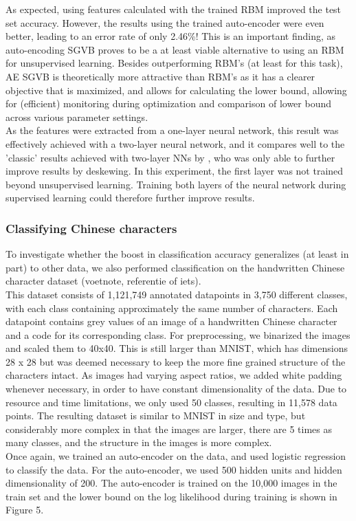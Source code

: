 \documentclass{article}
\begin{document}
As expected, using features calculated with the trained RBM improved the test set accuracy. However, the results using the trained auto-encoder were even better, leading to an error rate of only 2.46\%! This is an important finding, as auto-encoding SGVB proves to be a at least viable alternative to using an RBM for unsupervised learning. Besides outperforming RBM's (at least for this task), AE SGVB is theoretically more attractive than RBM's as it has a clearer objective that is maximized, and allows for calculating the lower bound, allowing for (efficient) monitoring during optimization and comparison  of lower bound across various parameter settings.\\
As the features were extracted from a one-layer neural network, this result was effectively achieved with a two-layer neural network, and it compares well to the 'classic' results achieved with two-layer NNs by \cite{lecun1998gradient}, who was only able to further improve results by deskewing. In this experiment, the first layer was not trained beyond unsupervised learning. Training both layers of the neural network during supervised learning could therefore further improve results.

\subsubsection{Classifying Chinese characters}

To investigate whether the boost in classification accuracy generalizes (at least in part) to other data, we also performed classification on the handwritten Chinese character dataset (voetnote, referentie of iets). \\
This dataset consists of 1,121,749 annotated datapoints in 3,750 different classes, with each class containing approximately the same number of characters. Each datapoint contains grey values of an image of a handwritten Chinese character and a code for its corresponding class. For preprocessing, we binarized the images and scaled them to 40x40. This is still larger than MNIST, which has dimensions 28 x 28 but was deemed necessary to keep the more fine grained structure of the characters intact. As images had varying aspect ratios, we added white padding whenever necessary, in order to have constant dimensionality of the data. Due to resource and time limitations, we only used 50 classes, resulting in 11,578 data points. The resulting dataset is similar to MNIST in size and type, but considerably more complex in that the images are larger, there are 5 times as many classes, and the structure in the images is more complex.\\
Once again, we trained an auto-encoder on the data, and used logistic regression to classify the data. For the auto-encoder, we used 500 hidden units and hidden dimensionality of 200. The auto-encoder is trained on the 10,000 images in the train set and the lower bound on the log likelihood during training is shown in Figure 5. 
\end{document}

